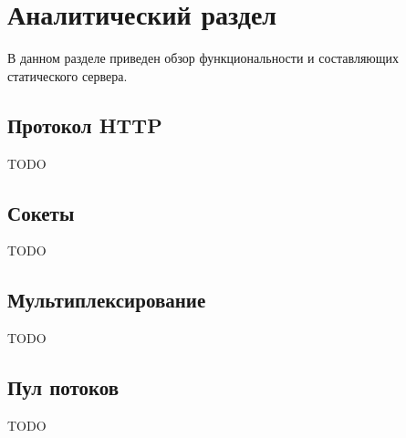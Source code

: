 \chapter{Аналитический раздел}

В данном разделе приведен обзор функциональности и составляющих статического сервера.

\section{Протокол HTTP}
TODO

\section{Сокеты}
TODO

\section{Мультиплексирование}
TODO

\section{Пул потоков}
TODO